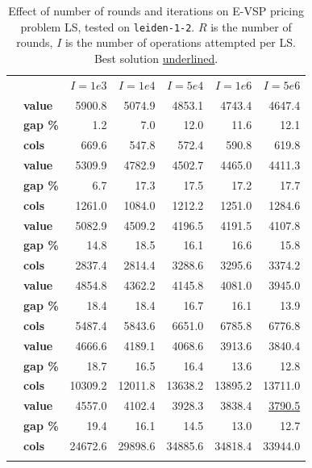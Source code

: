 \documentclass[]{article}
\begin{document}
\begin{table}[h]
  \centering
  \begin{tabular}{llrrrrr}
    \toprule
    && $I=1e3$ & $I=1e4$ & $I=5e4$ & $I=1e6$ & $I=5e6$  \\
    \arrayrulecolor{black!30}\cmidrule(lr){1-7}
    \addlinespace[0.4em]
    \multirow{3}{*}{$R=100$} & \textbf{value}  & 5900.8 & 5074.9 & 4853.1 & 4743.4 & 4647.4 \\
    & \textbf{gap \%} & 1.2 & 7.0 & 12.0 & 11.6 & 12.1 \\
    & \textbf{cols} & 669.6 & 547.8 & 572.4 & 590.8 & 619.8 \\
    \arrayrulecolor{black!30}\cmidrule(lr){1-7}
    \multirow{3}{*}{$R=200$} & \textbf{value}  & 5309.9 & 4782.9 & 4502.7 & 4465.0 & 4411.3 \\
    & \textbf{gap \%} & 6.7 & 17.3 & 17.5 & 17.2 & 17.7 \\
    & \textbf{cols} & 1261.0 & 1084.0 & 1212.2 & 1251.0 & 1284.6 \\
    \arrayrulecolor{black!30}\cmidrule(lr){1-7}
    \multirow{3}{*}{$R=500$} & \textbf{value}  & 5082.9 & 4509.2 & 4196.5 & 4191.5 & 4107.8 \\
    & \textbf{gap \%} & 14.8 & 18.5 & 16.1 & 16.6 & 15.8 \\
    & \textbf{cols} & 2837.4 & 2814.4 & 3288.6 & 3295.6 & 3374.2 \\
    \arrayrulecolor{black!30}\cmidrule(lr){1-7}
    \multirow{3}{*}{$R=1000$} & \textbf{value}  & 4854.8 & 4362.2 & 4145.8 & 4081.0 & 3945.0 \\
    & \textbf{gap \%} & 18.4 & 18.4 & 16.7 & 16.1 & 13.9 \\
    & \textbf{cols} & 5487.4 & 5843.6 & 6651.0 & 6785.8 & 6776.8 \\
    \arrayrulecolor{black!30}\cmidrule(lr){1-7}
    \multirow{3}{*}{$R=2000$} & \textbf{value}  & 4666.6 & 4189.1 & 4068.6 & 3913.6 & 3840.4 \\
    & \textbf{gap \%} & 18.7 & 16.5 & 16.4 & 13.6 & 12.8 \\
    & \textbf{cols} & 10309.2 & 12011.8 & 13638.2 & 13895.2 & 13711.0 \\
    \arrayrulecolor{black!30}\cmidrule(lr){1-7}
    \multirow{3}{*}{$R=5000$} & \textbf{value}  & 4557.0 & 4102.4 & 3928.3 & 3838.4 & \underline{3790.5} \\
    & \textbf{gap \%} & 19.4 & 16.1 & 14.5 & 13.0 & 12.7 \\
    & \textbf{cols} & 24672.6 & 29898.6 & 34885.6 & 34818.4 & 33944.0 \\
    \arrayrulecolor{black}\bottomrule
  \end{tabular}
  \caption{Effect of number of rounds and iterations on E-VSP pricing problem LS, tested on \texttt{leiden-1-2}. $R$ is the number of rounds, $I$ is the number of operations attempted per LS. Best solution \underline{underlined}.}
  \label{tab:evsp-ls-single}
\end{table}
\end{document}
